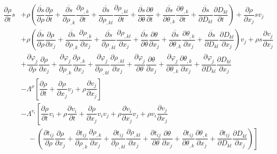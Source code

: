 \documentclass[a4paper,fleqn]{cas-sc}
\theoremstyle{definition}
\begin{document}
\begin{align*} %
	\dfrac{\partial\rho}{\partial t}s & + \rho\left(\overline{\dfrac{\partial s}{\partial\rho}}\dfrac{\partial\rho}{\partial t}+\overline{\dfrac{\partial s}{\partial\rho_{,k}}}\dfrac{\partial\rho_{,k}}{\partial t}+\overline{\dfrac{\partial s}{\partial\rho_{,kl}}}\dfrac{\partial\rho_{,kl}}{\partial t}+\overline{\dfrac{\partial s}{\partial\theta}}\dfrac{\partial\theta}{\partial t}+\overline{\dfrac{\partial s}{\partial\theta_{,k}}}\dfrac{\partial\theta_{,k}}{\partial t}+\overline{\dfrac{\partial s}{\partial D_{kl}}}\dfrac{\partial D_{kl}}{\partial t}\right)+\dfrac{\partial\rho}{\partial x_j}sv_j
	\\
	&+\rho\left(\overline{\dfrac{\partial s}{\partial\rho}}\dfrac{\partial\rho}{\partial x_j}+\overline{\dfrac{\partial s}{\partial\rho_{,k}}}\dfrac{\partial\rho_{,k}}{\partial x_j}+\overline{\dfrac{\partial s}{\partial\rho_{,kl}}}\dfrac{\partial\rho_{,kl}}{\partial x_j}+\overline{\dfrac{\partial s}{\partial\theta}}\dfrac{\partial\theta}{\partial x_j}+\overline{\dfrac{\partial s}{\partial\theta_{,k}}}\dfrac{\partial\theta_{,k}}{\partial x_j}+\overline{\dfrac{\partial s}{\partial D_{kl}}}\dfrac{\partial D_{kl}}{\partial x_j}\right)v_j+\rho s \dfrac{\partial v_j}{\partial x_j}
	\\
	&+\dfrac{\partial\varphi_j}{\partial\rho}\dfrac{\partial\rho}{\partial x_j}+\dfrac{\partial\varphi_j}{\partial\rho_{,k}}\dfrac{\partial\rho_{,k}}{\partial x_j}+\dfrac{\partial\varphi_j}{\partial\rho_{,kl}}\dfrac{\partial\rho_{,kl}}{\partial x_j}+\dfrac{\partial\varphi_j}{\partial\theta}\dfrac{\partial\theta}{\partial x_j}+\dfrac{\partial\varphi_j}{\partial\theta_{,k}}\dfrac{\partial\theta_{,k}}{\partial x_j}+\dfrac{\partial\varphi_j}{\partial D_{kl}}\dfrac{\partial D_{kl}}{\partial x_j} 
	\\
	&-\Lambda^\rho\left[\dfrac{\partial\rho}{\partial t}+\dfrac{\partial\rho}{\partial x_j}v_j+\rho\dfrac{\partial v_j}{\partial x_j}\right] 
	\\
	&-\Lambda^{v_i}\left[\dfrac{\partial\rho}{\partial t}v_i+\rho\dfrac{\partial v_i}{\partial t}+\dfrac{\partial\rho}{\partial x_j}v_iv_j+\rho\dfrac{\partial v_i}{\partial x_j}v_j+\rho v_i\dfrac{\partial v_j}{\partial x_j}\right.
	\\
	& \quad -\left.\left(\dfrac{\partial t_{ij}}{\partial\rho}\dfrac{\partial\rho}{\partial x_j}+\dfrac{\partial t_{ij}}{\partial\rho_{,k}}\dfrac{\partial\rho_{,k}}{\partial x_j}+\dfrac{\partial t_{ij}}{\partial\rho_{,kl}}\dfrac{\partial\rho_{,kl}}{\partial x_j}+\dfrac{\partial t_{ij}}{\partial\theta}\dfrac{\partial\theta}{\partial x_j}+\dfrac{\partial t_{ij}}{\partial\theta_{,k}}\dfrac{\partial\theta_{,k}}{\partial x_j}+\dfrac{\partial t_{ij}}{\partial D_{kl}}\dfrac{\partial D_{kl}}{\partial x_j}\right)\right] 

\end{align*}
\end{document}
